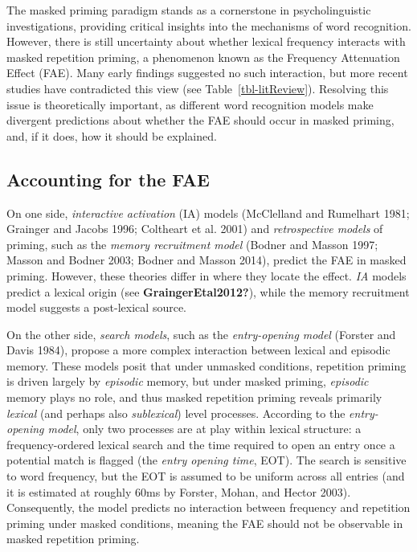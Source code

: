 \documentclass[
]{interact}
\begin{document}
The masked priming paradigm stands as a cornerstone in psycholinguistic
investigations, providing critical insights into the mechanisms of word
recognition. However, there is still uncertainty about whether lexical
frequency interacts with masked repetition priming, a phenomenon known
as the Frequency Attenuation Effect (FAE). Many early findings suggested
no such interaction, but more recent studies have contradicted this view
(see Table~\ref{tbl-litReview}). Resolving this issue is theoretically
important, as different word recognition models make divergent
predictions about whether the FAE should occur in masked priming, and,
if it does, how it should be explained.

\subsection{Accounting for the FAE}\label{accounting-for-the-fae}

On one side, \emph{interactive activation} (IA) models (McClelland and
Rumelhart 1981; Grainger and Jacobs 1996; Coltheart et al. 2001) and
\emph{retrospective models} of priming, such as the \emph{memory
recruitment model} (Bodner and Masson 1997; Masson and Bodner 2003;
Bodner and Masson 2014), predict the FAE in masked priming. However,
these theories differ in where they locate the effect. \emph{IA} models
predict a lexical origin (see \textbf{GraingerEtal2012?}), while the
memory recruitment model suggests a post-lexical source.

On the other side, \emph{search models}, such as the \emph{entry-opening
model} (Forster and Davis 1984), propose a more complex interaction
between lexical and episodic memory. These models posit that under
unmasked conditions, repetition priming is driven largely by
\emph{episodic} memory, but under masked priming, \emph{episodic} memory
plays no role, and thus masked repetition priming reveals primarily
\emph{lexical} (and perhaps also \emph{sublexical}) level processes.
According to the \emph{entry-opening model}, only two processes are at
play within lexical structure: a frequency-ordered lexical search and
the time required to open an entry once a potential match is flagged
(the \emph{entry opening time}, EOT). The search is sensitive to word
frequency, but the EOT is assumed to be uniform across all entries (and
it is estimated at roughly 60ms by Forster, Mohan, and Hector 2003).
Consequently, the model predicts no interaction between frequency and
repetition priming under masked conditions, meaning the FAE should not
be observable in masked repetition priming.
\end{document}
